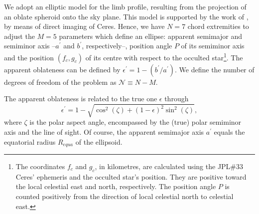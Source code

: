 \documentclass[useAMS,usenatbib]{mn2e}
\begin{document}
We adopt an elliptic model for the limb profile, resulting from the projection of an oblate spheroid onto the sky plane. This model is supported by the work of \cite{Drummond2014}, by means of direct imaging of Ceres. Hence, we have $N=7$ chord extremities to adjust the $M=5$ parameters which define an ellipse: apparent semimajor and semiminor axis --$a^\prime$ and $b^\prime$, respectively--, position angle $P$ of its semiminor axis and the position $(f_c,g_c)$ of its centre with respect to the occulted star\footnote{The coordinates $f_{c}$ and $g_{c}$, in kilometres, are calculated using the JPL\#33 Ceres' ephemeris and the occulted star's position. They are positive toward the local celestial east and north, respectively. The position angle $P$ is counted positively from the direction of local celestial north to celestial east.}. The apparent oblateness can be defined by $\epsilon^\prime = 1 - (b^\prime/a^\prime)$. We define the number of degrees of freedom of the problem as $\mathcal{N} \equiv N - M$.


The apparent oblateness is related to the true one $\epsilon$ through
%
\begin{equation}
\epsilon^\prime = 1 - \sqrt{\cos^2(\zeta) + (1-\epsilon)^2\sin^2(\zeta)},
\label{TrueObla}
\end{equation}
%
where $\zeta$ is the polar aspect angle, encompassed by the (true) polar semiminor axis and the line of sight. Of course, the apparent semimajor axis $a^\prime$ equals the equatorial radius $R_{equa}$ of the ellipsoid.
\end{document}
